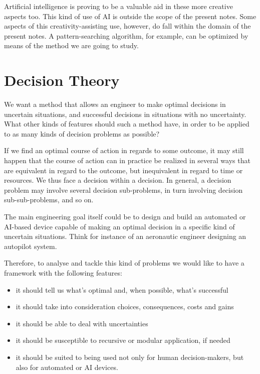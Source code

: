 \documentclass[
  a4paper,
  DIV=11,
  numbers=noendperiod,
  oneside]{scrreprt}
\begin{document}
Artificial intelligence is proving to be a valuable aid in these more
creative aspects too. This kind of use of AI is outside the scope of the
present notes. Some aspects of this creativity-assisting use, however,
do fall within the domain of the present notes. A pattern-searching
algorithm, for example, can be optimized by means of the method we are
going to study.

\hypertarget{decision-theory}{%
\section{Decision Theory}\label{decision-theory}}

We want a method that allows an engineer to make optimal decisions in
uncertain situations, and successful decisions in situations with no
uncertainty. What other kinds of features should such a method have, in
order to be applied to as many kinds of decision problems as possible?

If we find an optimal course of action in regards to some outcome, it
may still happen that the course of action can in practice be realized
in several ways that are equivalent in regard to the outcome, but
inequivalent in regard to time or resources. We thus face a decision
within a decision. In general, a decision problem may involve several
decision sub-problems, in turn involving decision sub-sub-problems, and
so on.

The main engineering goal itself could be to design and build an
automated or AI-based device capable of making an optimal decision in a
specific kind of uncertain situations. Think for instance of an
aeronautic engineer designing an autopilot system.

Therefore, to analyse and tackle this kind of problems we would like to
have a framework with the following features:

\begin{itemize}
\item
  it should tell us what's optimal and, when possible, what's successful
\item
  it should take into consideration choices, consequences, costs and
  gains
\item
  it should be able to deal with uncertainties
\item
  it should be susceptible to recursive or modular application, if
  needed
\item
  it should be suited to being used not only for human decision-makers,
  but also for automated or AI devices.
\end{itemize}
\end{document}
